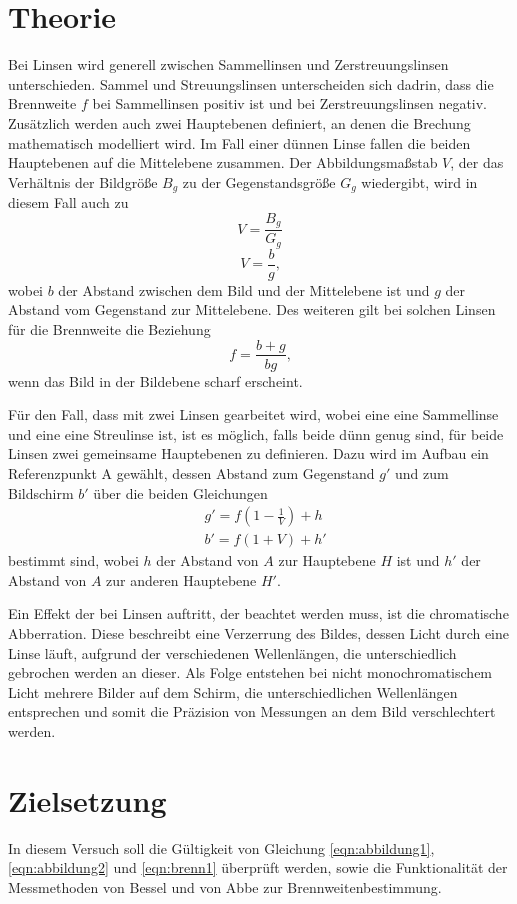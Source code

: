 \section{Theorie \cite{V408}}
\label{sec:Theorie}
    \noindent Bei Linsen wird generell zwischen Sammellinsen und Zerstreuungslinsen unterschieden. Sammel und Streuungslinsen unterscheiden sich dadrin, dass die Brennweite $f$ bei Sammellinsen positiv ist und bei Zerstreuungslinsen negativ.
    Zusätzlich werden auch zwei Hauptebenen definiert, an denen die Brechung mathematisch modelliert wird. Im Fall einer dünnen Linse fallen die beiden Hauptebenen auf die Mittelebene zusammen. Der Abbildungsmaßstab $V$, der das Verhältnis der Bildgröße $B_g$
    zu der Gegenstandsgröße $G_g$ wiedergibt, wird in diesem Fall auch zu
    \begin{equation}
        V=\frac{B_g}{G_g} 
        \label{eqn:abbildung1}
    \end{equation}
    \begin{equation}
        V=\frac{b}{g} \text{,}
        \label{eqn:abbildung2}
    \end{equation}
    \noindent wobei $b$ der Abstand zwischen dem Bild und der Mittelebene ist und $g$ der Abstand vom Gegenstand zur Mittelebene.
    Des weiteren gilt bei solchen Linsen für die Brennweite die Beziehung
    \begin{equation}
        f=\frac{b+g}{bg} \text{,}
        \label{eqn:brenn1}
    \end{equation}
    \noindent wenn das Bild in der Bildebene scharf erscheint.

    \noindent Für den Fall, dass mit zwei Linsen gearbeitet wird, wobei eine eine Sammellinse und eine eine Streulinse ist, ist es möglich, falls beide dünn genug sind, für beide Linsen zwei gemeinsame Hauptebenen zu definieren.
    Dazu wird im Aufbau ein Referenzpunkt A gewählt, dessen Abstand zum Gegenstand $g'$ und zum Bildschirm $b'$ über die beiden Gleichungen
    \begin{align}
       & g'=f(1-\frac{1}{V})+h \\
        & b'=f(1+V)+h'
        \label{eqn:abbe}
    \end{align}
    bestimmt sind, wobei $h$ der Abstand von $A$ zur Hauptebene $H$ ist und $h'$ der Abstand von $A$ zur anderen Hauptebene $H'$.

    \noindent Ein Effekt der bei Linsen auftritt, der beachtet werden muss, ist die chromatische Abberration. Diese beschreibt eine Verzerrung des Bildes, dessen Licht durch eine Linse läuft, aufgrund der verschiedenen Wellenlängen, die unterschiedlich gebrochen werden an dieser.
    Als Folge entstehen bei nicht monochromatischem Licht mehrere Bilder auf dem Schirm, die unterschiedlichen Wellenlängen entsprechen und somit die Präzision von Messungen an dem Bild verschlechtert werden.



\section{Zielsetzung}
In diesem Versuch soll die Gültigkeit von Gleichung \ref{eqn:abbildung1}, \ref{eqn:abbildung2} und \ref{eqn:brenn1} überprüft werden, sowie die Funktionalität der Messmethoden von Bessel und von Abbe zur Brennweitenbestimmung.